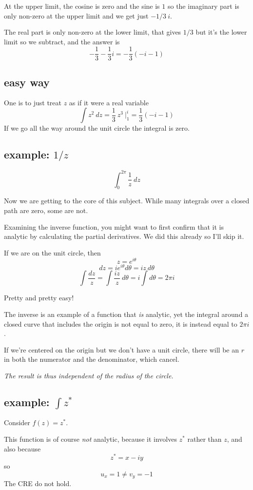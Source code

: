 \documentclass[11pt, oneside]{article}
\begin{document}
At the upper limit, the cosine is zero and the sine is $1$ so the imaginary part is only non-zero at the upper limit and we get just $-1/3 \ i$.  

The real part is only non-zero at the lower limit, that gives $1/3$ but it's the lower limit so we subtract, and the answer is
\[ -\frac{1}{3} - \frac{1}{3} i = -\frac{1}{3} (-i - 1) \]

\subsection*{easy way}
One is to just treat $z$ as if it were a real variable
\[ \int z^2 \ dz = \frac{1}{3} \ z^3 \ \bigg |_1^i = \frac{1}{3} (-i - 1) \]
If we go all the way around the unit circle the integral is zero.


\subsection*{example:  $1/z$}
\[ \int_0^{2\pi} \frac{1}{z} \ dz \]

Now we are getting to the core of this subject.  While many integrals over a closed path are zero, some are not.

Examining the inverse function, you might want to first confirm that it is analytic by calculating the partial derivatives.  We did this already so I'll skip it.

If we are on the unit circle, then 
\[ z = e^{i\theta} \]
\[ dz = ie^{i\theta} d \theta = iz\ d \theta \]
\[ \int \frac{dz}{z} = \int \frac{iz}{z} \ d \theta = i \int d \theta = 2 \pi i \]

Pretty and pretty easy!

The inverse is an example of a function that \emph{is} analytic, yet the integral around a closed curve that includes the origin is not equal to zero, it is instead equal to $2 \pi i$.  

If we're centered on the origin but we don't have a unit circle, there will be an $r$ in both the numerator and the denominator, which cancel.

\emph{The result is thus independent of the radius of the circle.}

\subsection*{example:  $\int z^*$}
Consider $f(z) = z^*$.

This function is of course \emph{not} analytic, because it involves $z^*$ rather than $z$, and also because
\[ z^* = x - iy \]
so
\[ u_x = 1 \ne v_y = - 1 \]
The CRE do not hold.
\end{document}
